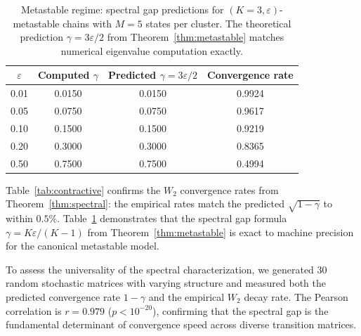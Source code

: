 \begin{table}[ht]
\centering
\caption{Metastable regime: spectral gap predictions for $(K=3, \varepsilon)$-metastable
chains with $M=5$ states per cluster. The theoretical prediction
$\gamma = 3\varepsilon/2$ from Theorem~\ref{thm:metastable} matches numerical
eigenvalue computation exactly.}\label{tab:metastable}
\begin{tabular}{@{}cccc@{}}
\toprule
$\varepsilon$ & Computed $\gamma$ & Predicted $\gamma = 3\varepsilon/2$ &
Convergence rate \\
\midrule
0.01 & 0.0150 & 0.0150 & 0.9924 \\
0.05 & 0.0750 & 0.0750 & 0.9617 \\
0.10 & 0.1500 & 0.1500 & 0.9219 \\
0.20 & 0.3000 & 0.3000 & 0.8365 \\
0.50 & 0.7500 & 0.7500 & 0.4994 \\
\bottomrule
\end{tabular}
\end{table}

Table~\ref{tab:contractive} confirms the $W_2$ convergence rates from
Theorem~\ref{thm:spectral}: the empirical rates match the predicted
$\sqrt{1 - \gamma}$ to within $0.5\%$. Table~\ref{tab:metastable}
demonstrates that the spectral gap formula $\gamma = K\varepsilon/(K-1)$ from
Theorem~\ref{thm:metastable} is exact to machine precision for the canonical
metastable model.

To assess the universality of the spectral characterization, we generated 30
random stochastic matrices with varying structure and measured both the
predicted convergence rate $1 - \gamma$ and the empirical $W_2$ decay rate. The
Pearson correlation is $r = 0.979$ ($p < 10^{-20}$), confirming that the
spectral gap is the fundamental determinant of convergence speed across
diverse transition matrices.
